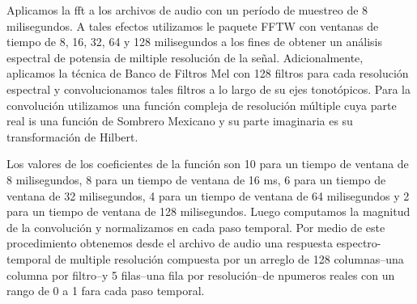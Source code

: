 Aplicamos la \gls{fft} a los archivos de audio con un período de muestreo de 8 milisegundos.
A tales efectos utilizamos le paquete FFTW \cite{FFTW05, fftw} con ventanas de tiempo de 8, 16, 32, 64 y 128 milisegundos a los fines de obtener un análisis espectral de potensia de miltiple resolución de la señal.
Adicionalmente, aplicamos la técnica de Banco de Filtros Mel con 128 filtros para cada resolución espectral y convolucionamos tales filtros a lo largo de su ejes tonotópicos. Para la convolución utilizamos una función compleja de resolución múltiple cuya parte real is una función de Sombrero Mexicano y su parte imaginaria es su transformación de Hilbert.

Los valores de los coeficientes de la función son 10 para un tiempo de ventana de 8 milisegundos, 8 para un tiempo de ventana de 16 ms, 6 para un tiempo de ventana de 32 milisegundos, 4 para un tiempo de ventana de 64 milisegundos y 2 para un tiempo de ventana de 128 milisegundos.
Luego computamos la magnitud de la convolución y normalizamos en cada paso temporal.
Por medio de este procedimiento obtenemos desde el archivo de audio una respuesta espectro-temporal de multiple resolución compuesta por un arreglo de 128 columnas--una columna por filtro--y 5 filas--una fila por resolución--de npumeros reales con un rango de 0 a 1 fara cada paso temporal.




